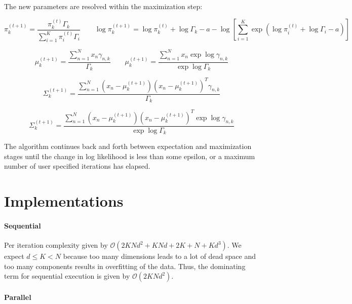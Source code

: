 \documentclass{article}
\newcommand{\boundedBy}[1]{\mathcal{O} \left ( #1 \right )}
\begin{document}
The new parameters are resolved within the maximization step:

\begin{equation}
	\pi_{k}^{(t+1)} = \frac{ \pi_{k}^{(t)} \Gamma_k }{ \sum_{i=1}^{K} \pi_{i}^{(t)} \Gamma_i }
	\qquad
	\log \pi_{k}^{(t+1)} = \log \pi_{k}^{(t)} + \log \Gamma_k - a - \log \left [ \sum_{i=1}^{K} \exp{ \left( \log \pi_{i}^{(t)} + \log \Gamma_i - a \right )} \right ]
\end{equation}

\begin{equation}
	\mu_k^{(t+1)} = \frac{ \sum_{n=1}^{N} x_n \gamma_{n, k} }{ \Gamma_k  }
	\qquad
	\mu_k^{(t+1)} = \frac{ \sum_{n=1}^{N} x_n \exp{ \log \gamma_{n, k} } }{ \exp{ \log \Gamma_k }  }
\end{equation}

\begin{equation}
	\Sigma_k^{(t+1)} = \frac{ \sum_{n=1}^{N} (x_n - \mu_k^{(t+1)}) (x_n - \mu_k^{(t+1)})^T \gamma_{n, k} }{ \Gamma_k  }
\end{equation}

\begin{equation}
	\Sigma_k^{(t+1)} = \frac{ \sum_{n=1}^{N} (x_n - \mu_k^{(t+1)}) (x_n - \mu_k^{(t+1)})^T \exp \log \gamma_{n, k} }{ \exp \log \Gamma_k  }
\end{equation}

The algorithm continues back and forth between expectation and maximization stages until the change in log likelihood is less than some epsilon, or a maximum number of user specified iterations has elapsed.

\section{Implementations}

\paragraph{Sequential} Per iteration complexity given by $\boundedBy{2 K N d^2 + K N d + 2K + N + K d^3}$. We expect $d \le K < N$ because too many dimensions leads to a lot of dead space and too many components results in overfitting of the data. Thus, the dominating term for sequential execution is given by $\boundedBy{ 2 K N d^2 }$. 

\paragraph{Parallel}
\end{document}
